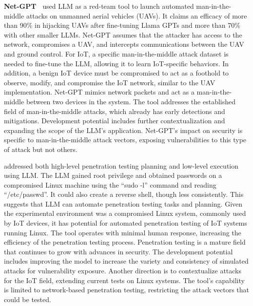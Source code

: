 \smallskip
\noindent \textbf{Net-GPT~\citet{10419242}} used LLM as a red-team tool to launch automated man-in-the-middle attacks on unmanned aerial vehicles (UAVs).
It claims an efficacy of more than 90\% in hijacking UAVs after fine-tuning Llama GPTs and more than 70\% with other smaller LLMs.
Net-GPT assumes that the attacker has access to the network, compromises a UAV, and intercepts communications between the UAV and ground control.
For IoT, a specific man-in-the-middle attack dataset is needed to fine-tune the LLM, allowing it to learn IoT-specific behaviors.
In addition, a benign IoT device must be compromised to act as a foothold to observe, modify, and compromise the IoT network, similar to the UAV implementation.
Net-GPT mimics network packets and act as a man-in-the-middle between two devices in the system.
The tool addresses the established field of man-in-the-middle attacks, which already has early detections and mitigations.
Development potential includes further contextualization and expanding the scope of the LLM's application.
Net-GPT's impact on security is specific to man-in-the-middle attack vectors, exposing vulnerabilities to this type of attack but not others.

\smallskip
\noindent \textbf{\citet{Happe_2023}} addressed both high-level penetration testing planning and low-level execution using LLM.
The LLM gained root privilege and obtained passwords on a compromised Linux machine using the ``sudo -l'' command and reading ``/etc/passwd''.
It could also create a reverse shell, though less consistently.
This suggests that LLM can automate penetration testing tasks and planning.
Given the experimental environment was a compromised Linux system, commonly used by IoT devices, it has potential for automated penetration testing of IoT systems running Linux.
The tool operates with minimal human response, increasing the efficiency of the penetration testing process.
Penetration testing is a mature field that continues to grow with advances in security.
The development potential includes improving the model to increase the variety and consistency of simulated attacks for vulnerability exposure.
Another direction is to contextualize attacks for the IoT field, extending current tests on Linux systems.
The tool's capability is limited to network-based penetration testing, restricting the attack vectors that could be tested.

